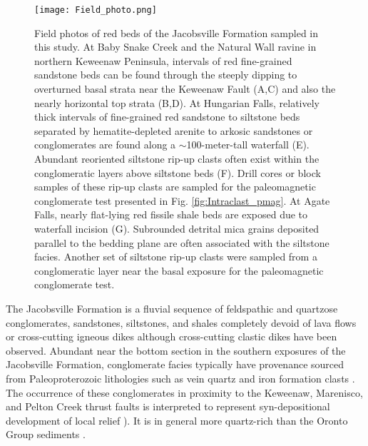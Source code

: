 \documentclass[draft]{agujournal2019}
\begin{document}
\begin{figure}[h!]
\centering
\texttt{[image: Field\_photo.png]}
\caption{\scriptsize Field photos of red beds of the Jacobsville Formation sampled in this study. At Baby Snake Creek and the Natural Wall ravine in northern Keweenaw Peninsula, intervals of red fine-grained sandstone beds can be found through the steeply dipping to overturned basal strata near the Keweenaw Fault (A,C) and also the nearly horizontal top strata (B,D). At Hungarian Falls, relatively thick intervals of fine-grained red sandstone to siltstone beds separated by hematite-depleted arenite to arkosic sandstones or conglomerates are found along a $\sim$100-meter-tall waterfall (E). Abundant reoriented siltstone rip-up clasts often exist within the conglomeratic layers above siltstone beds (F). Drill cores or block samples of these rip-up clasts are sampled for the paleomagnetic conglomerate test presented in Fig. \ref{fig:Intraclast_pmag}. At Agate Falls, nearly flat-lying red fissile shale beds are exposed due to waterfall incision (G). Subrounded detrital mica grains deposited parallel to the bedding plane are often associated with the siltstone facies. Another set of siltstone rip-up clasts were sampled from a conglomeratic layer near the basal exposure for the paleomagnetic conglomerate test. }
\label{fig:Field_photo}
\end{figure}

The Jacobsville Formation is a fluvial sequence of feldspathic and quartzose conglomerates, sandstones, siltstones, and shales completely devoid of lava flows or cross-cutting igneous dikes although cross-cutting clastic dikes have been observed. Abundant near the bottom section in the southern exposures of the Jacobsville Formation, conglomerate facies typically have provenance sourced from Paleoproterozoic lithologies such as vein quartz and iron formation clasts \cite{Hamblin1958a, Kalliokoski1982a}. The occurrence of these conglomerates in proximity to the Keweenaw, Marenisco, and Pelton Creek thrust faults is interpreted to represent syn-depositional development of local relief \cite{Kalliokoski1982a, Hedgman2014a}). It is in general more quartz-rich than the Oronto Group sediments \cite{Hamblin1958a}. 
\end{document}
